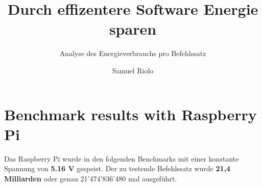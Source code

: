 \documentclass{../template/ffhsthesis}
\begin{document}


\title{Durch effizentere Software Energie sparen}
\subtitle{Analyse des Energieverbrauchs pro Befehlssatz} %
\author{Samuel Riolo}


\maketitle



\startThesis
\chapter{Benchmark results with Raspberry Pi}
Das Raspberry Pi wurde in den folgenden Benchmarks mit einer konstante Spannung von \textbf{5.16 V} gespeist. Der zu testende Befehlssatz wurde \textbf{21,4 Milliarden} oder genau 21'474'836'480 mal ausgeführt.

\tikzset{every picture/.style=thick}
\end{document}
